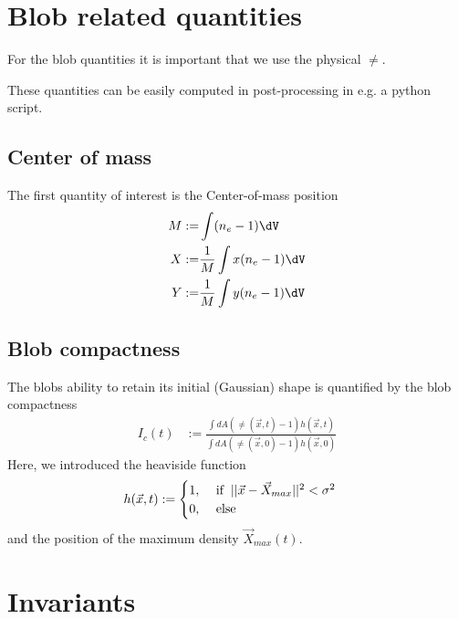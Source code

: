 \section{Blob related quantities}
For the blob quantities it is important that we use the physical $\ne$.
\begin{tcolorbox}[title=Note]
    These quantities can be easily computed in post-processing in e.g. a python script.
\end{tcolorbox}

\subsection{Center of mass}
The first quantity of interest is the Center-of-mass position
\begin{align}
    M :=& \int (\ne -1 ) \dV \\
    X :=& \frac{1}{M} \int x(\ne - 1) \dV \\
    Y :=& \frac{1}{M} \int y(\ne - 1) \dV
\end{align}
\subsection{Blob compactness}
The blobs ability to retain its initial (Gaussian) shape is quantified by the  blob compactness
\begin{align}
     I_c(t) &:= \frac{\int dA (\ne(\vec{x},t)-1) h(\vec{x},t)}{\int dA
(\ne(\vec{x},0)-1) h(\vec{x},0)}
\end{align}
Here, we introduced the heaviside function
\begin{align}
     h(\vec{x},t) &:= \begin{cases}
          1,
        &\ \text{if} \hspace{2mm}||\vec{x} - \vec{X}_{max}||^2 < \sigma^2 \\
0,  &\ \text{else}
           \end{cases} \nonumber
\end{align}
and the position of the maximum density \( \vec{X}_{max}(t)\).


\section{Invariants}
